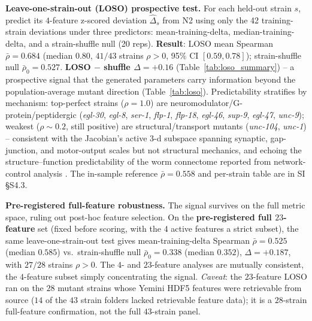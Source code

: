 \documentclass[11pt]{article}
\begin{document}
\textbf{Leave-one-strain-out (LOSO) prospective test.} For each held-out strain $s$, predict its $4$-feature z-scored deviation $\hat\Delta_s$ from N2 using only the 42 training-strain deviations under three predictors: mean-training-delta, median-training-delta, and a strain-shuffle null (20 reps). \textbf{Result}: LOSO mean Spearman $\bar\rho{=}\mathbf{0.684}$ (median $0.80$, $41/43$ strains $\rho{>}0$, 95\% CI $[0.59,0.78]$); strain-shuffle null $\bar\rho_0{=}0.527$. \textbf{LOSO $-$ shuffle $\Delta{=}{+}0.16$} (Table~\ref{tab:loso_summary}) -- a prospective signal that the generated parameters carry information beyond the population-average mutant direction (Table~\ref{tab:loso}). Predictability stratifies by mechanism: top-perfect strains ($\rho{=}1.0$) are neuromodulator/G-protein/peptidergic (\emph{egl-30}, \emph{egl-8}, \emph{ser-1}, \emph{flp-1}, \emph{flp-18}, \emph{egl-46}, \emph{sup-9}, \emph{egl-47}, \emph{unc-9}); weakest ($\rho{\sim}0.2$, still positive) are structural/transport mutants (\emph{unc-104}, \emph{unc-1}) -- consistent with the Jacobian's active 3-d subspace spanning synaptic, gap-junction, and motor-output scales but not structural mechanics, and echoing the structure--function predictability of the worm connectome reported from network-control analysis \citep{yan2017network}. The in-sample reference $\bar\rho{=}0.558$ and per-strain table are in SI \S S4.3.

\textbf{Pre-registered full-feature robustness.} The signal survives on the full metric space, ruling out post-hoc feature selection. On the \textbf{pre-registered full $23$-feature} set (fixed before scoring, with the $4$ active features a strict subset), the same leave-one-strain-out test gives mean-training-delta Spearman $\bar\rho{=}\mathbf{0.525}$ (median $0.585$) vs.\ strain-shuffle null $\bar\rho_0{=}0.338$ (median $0.352$), $\Delta{=}{+}0.187$, with $27/28$ strains $\rho{>}0$. The $4$- and $23$-feature analyses are mutually consistent, the $4$-feature subset simply concentrating the signal. \emph{Caveat}: the $23$-feature LOSO ran on the $28$ mutant strains whose Yemini HDF5 features were retrievable from source ($14$ of the $43$ strain folders lacked retrievable feature data); it is a $28$-strain full-feature confirmation, not the full $43$-strain panel.
\end{document}
